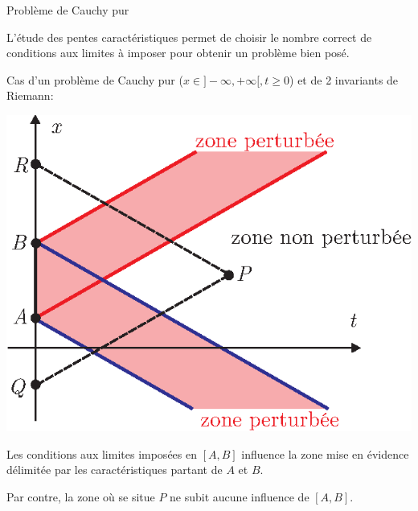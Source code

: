 \documentclass[
mode=present,    %
paper=a4paper,   %
orient=landscape,
display=slides,   %
size=10pt,
style=romain   %
]{powerdot}
\begin{document}
\begin{slide}[toc=Cauchy pur]{Problème de Cauchy pur}

L'étude des pentes caractéristiques permet de choisir le nombre correct de conditions aux limites à imposer pour obtenir un problème bien posé.

\bigskip

Cas d'un problème de Cauchy pur ($x\in]-\infty, +\infty[, t\ge0$) et de 2 invariants de Riemann:

\bigskip

\begin{minipage}[l]{\textwidth/2}
    \centerline{\includegraphics[width=\textwidth]{perturiemann.eps} }
\end{minipage}
\begin{minipage}[l]{\textwidth/2-1cm}
Les conditions aux limites imposées en $[A,B]$ influence la zone mise en évidence délimitée par les caractéristiques partant de $A$ et $B$.
\bigskip

Par contre, la zone où se situe $P$ ne subit aucune influence de $[A,B]$.
\end{minipage}

\end{slide}
\end{document}
